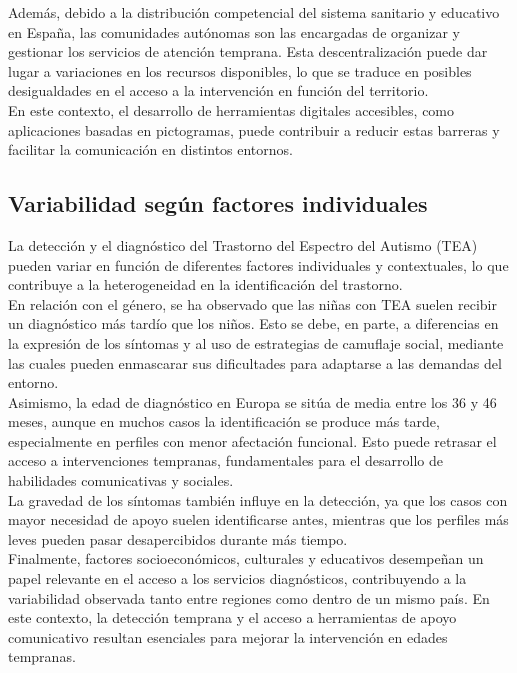 \documentclass{article}
\begin{document}
Además, debido a la distribución competencial del sistema sanitario y educativo en España, las comunidades autónomas son las encargadas de organizar y gestionar los servicios de atención temprana. Esta descentralización puede dar lugar a variaciones en los recursos disponibles, lo que se traduce en posibles desigualdades en el acceso a la intervención en función del territorio.\\

En este contexto, el desarrollo de herramientas digitales accesibles, como aplicaciones basadas en pictogramas, puede contribuir a reducir estas barreras y facilitar la comunicación en distintos entornos.

\subsection{\textbf{Variabilidad según factores individuales}}

La detección y el diagnóstico del Trastorno del Espectro del Autismo (TEA) pueden variar en función de diferentes factores individuales y contextuales, lo que contribuye a la heterogeneidad en la identificación del trastorno.\\

En relación con el género, se ha observado que las niñas con TEA suelen recibir un diagnóstico más tardío que los niños. Esto se debe, en parte, a diferencias en la expresión de los síntomas y al uso de estrategias de camuflaje social, mediante las cuales pueden enmascarar sus dificultades para adaptarse a las demandas del entorno.\\

Asimismo, la edad de diagnóstico en Europa se sitúa de media entre los 36 y 46 meses, aunque en muchos casos la identificación se produce más tarde, especialmente en perfiles con menor afectación funcional. Esto puede retrasar el acceso a intervenciones tempranas, fundamentales para el desarrollo de habilidades comunicativas y sociales.\\

La gravedad de los síntomas también influye en la detección, ya que los casos con mayor necesidad de apoyo suelen identificarse antes, mientras que los perfiles más leves pueden pasar desapercibidos durante más tiempo.\\

Finalmente, factores socioeconómicos, culturales y educativos desempeñan un papel relevante en el acceso a los servicios diagnósticos, contribuyendo a la variabilidad observada tanto entre regiones como dentro de un mismo país. En este contexto, la detección temprana y el acceso a herramientas de apoyo comunicativo resultan esenciales para mejorar la intervención en edades tempranas.
\end{document}
